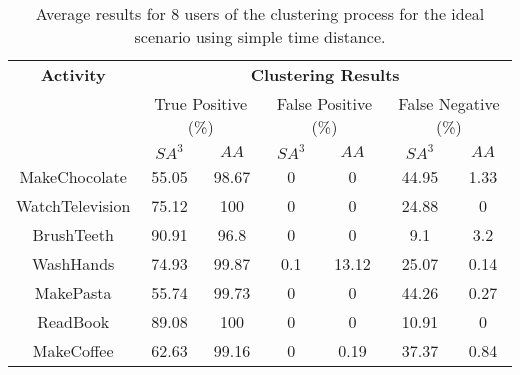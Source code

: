 \begin{table}[htbp]\scriptsize
    \begin{center}    
        \begin{tabular}{ccccccc}
            \hline            
            \textbf{Activity} & \multicolumn{6}{c}{\textbf{Clustering Results}} \\
             & \multicolumn{2}{c}{True Positive (\%)} & \multicolumn{2}{c}{False Positive (\%)} & \multicolumn{2}{c}{False Negative (\%)} \\
             & $SA^3$ & $AA$ & $SA^3$ & $AA$ & $SA^3$ & $AA$ \\
            \hline
            MakeChocolate   & 55.05 & 98.67 & 0    & 0    & 44.95 & 1.33 \\
	    WatchTelevision & 75.12 & 100   & 0    & 0    & 24.88 & 0    \\
	    BrushTeeth      & 90.91 & 96.8  & 0    & 0    & 9.1   & 3.2 \\
	    WashHands       & 74.93 & 99.87 & 0.1  & 13.12  & 25.07 & 0.14 \\
	    MakePasta       & 55.74 & 99.73 & 0    & 0    & 44.26 & 0.27 \\
	    ReadBook        & 89.08 & 100   & 0    & 0    & 10.91 & 0 \\
	    MakeCoffee      & 62.63 & 99.16 & 0    & 0.19 & 37.37 & 0.84 \\
            \hline
        \end{tabular}
        \caption{Average results for 8 users of the clustering process for the ideal scenario using simple time distance.}
        \label{tab-r-ideal-t1}
        \end{center}
\end{table}

